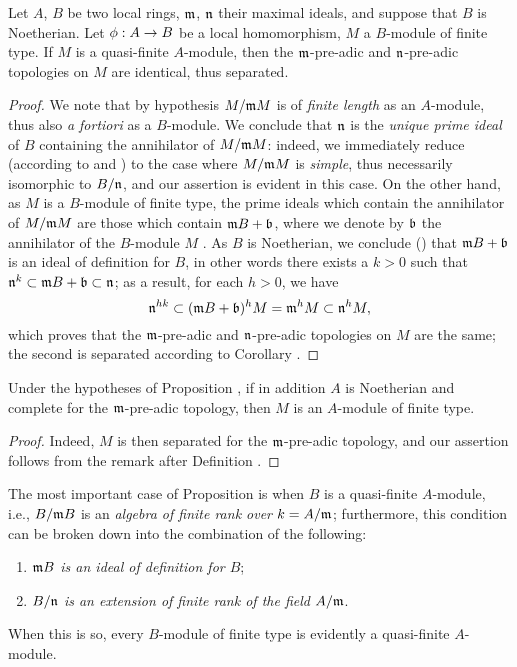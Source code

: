 \begin{prop}[7.4.2]
\label{0.7.4.2}
Let $A$, $B$ be two local rings, $\mathfrak{m}$, $\mathfrak{n}$ their maximal ideals, and
suppose that $B$ is Noetherian. Let $\vphi:A\to B$ be a local homomorphism, $M$ a $B$-module
of finite type. If $M$ is a quasi-finite $A$-module, then the $\mathfrak{m}$-pre-adic and
$\mathfrak{n}$-pre-adic topologies on $M$ are identical, thus separated.
\end{prop}

\begin{proof}
\label{proof-0.7.4.2}
We note that by hypothesis $M/\mathfrak{m}M$ is of \emph{finite length} as an $A$-module,
thus also \emph{a fortiori} as a $B$-module. We conclude that $\mathfrak{n}$ is the
\emph{unique prime ideal} of $B$ containing the annihilator of $M/\mathfrak{m}M$: indeed, we
immediately reduce (according to  and
) to the case where $M/\mathfrak{m}M$ is \emph{simple}, thus
necessarily isomorphic to $B/\mathfrak{n}$, and our assertion is evident in this case. On
the other hand, as $M$ is a $B$-module of finite type, the prime ideals which contain the
annihilator of $M/\mathfrak{m}M$ are those which contain $\mathfrak{m}B+\mathfrak{b}$, where
we denote by $\mathfrak{b}$ the annihilator of the $B$-module $M$
. As $B$ is Noetherian, we conclude
(\cite[p.~127, Cor.~4]{I-11}) that $\mathfrak{m}B+\mathfrak{b}$ is an ideal
of definition for $B$, in other words there exists a $k>0$ such that
$\mathfrak{n}^k\subset\mathfrak{m}B+\mathfrak{b}\subset\mathfrak{n}$; as a result, for each
$h>0$, we have
\[
  \mathfrak{n}^{hk}\subset(\mathfrak{m}B+\mathfrak{b})^h M
  =\mathfrak{m}^h M\subset\mathfrak{n}^h M,
\]
which proves that the $\mathfrak{m}$-pre-adic and $\mathfrak{n}$-pre-adic topologies on $M$
are the same; the second is separated according to Corollary .
\end{proof}

\begin{cor}[7.4.3]
\label{0.7.4.3}
Under the hypotheses of Proposition , if in addition $A$ is
Noetherian and complete for the $\mathfrak{m}$-pre-adic topology, then $M$ is an $A$-module
of finite type.
\end{cor}

\begin{proof}
\label{proof-0.7.4.3}
Indeed, $M$ is then separated for the $\mathfrak{m}$-pre-adic topology, and our assertion
follows from the remark after Definition .
\end{proof}

\begin{env}[7.4.4]
\label{0.7.4.4}
The most important case of Proposition  is when $B$ is a
quasi-finite $A$-module, i.e., $B/\mathfrak{m}B$ is an \emph{algebra of finite rank over
$k=A/\mathfrak{m}$}; furthermore, this condition can be broken down into the combination
of the following:
\begin{enumerate}[label=(\roman*)]
  \item \emph{$\mathfrak{m}B$ is an ideal of definition for $B$};
  \item \emph{$B/\mathfrak{n}$ is an extension of finite rank of the field $A/\mathfrak{m}$}.
\end{enumerate}
When this is so, every $B$-module of finite type is evidently a quasi-finite $A$-module.
\end{env}

